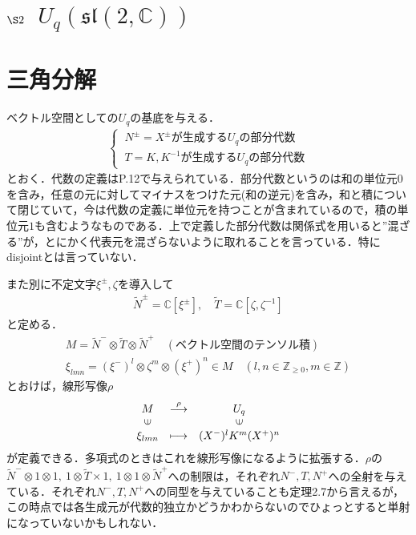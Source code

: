 \documentclass[dvipdfmx]{jsarticle}
\title{\empty}
\author{\empty}
\date{\today}
\begin{document}
%
%
%
%
\section*{$\S 2${\ }$U_q(\mathfrak{sl}(2,\mathbb{C}))$}
\section*{三角分解}
ベクトル空間としての$U_q$の基底を与える．
\begin{align*}
\begin{cases}
{\ }N^\pm=X^\pm が生成する U_q の部分代数 \\
{\ }T=K,K^{-1} が生成する U_q の部分代数
\end{cases}
\end{align*}
とおく．代数の定義はP.12で与えられている．部分代数というのは和の単位元$0$を含み，任意の元に対してマイナスをつけた元(和の逆元)を含み，和と積について閉じていて，今は代数の定義に単位元を持つことが含まれているので，積の単位元$1$も含むようなものである．上で定義した部分代数は関係式を用いると''混ざる''が，とにかく代表元を混ざらないように取れることを言っている．特にdisjointとは言っていない．\par
また別に不定文字$\xi^\pm,\zeta$を導入して
\begin{align*}
\widetilde{N}^\pm=\mathbb{C}[\xi^\pm], \quad \widetilde{T}=\mathbb{C}[\zeta,\zeta^{-1}]
\end{align*}
と定める．
\begin{align*}
M=\widetilde{N}^-\otimes\widetilde{T}\otimes\widetilde{N}^+ \quad (ベクトル空間のテンソル積) \\
\xi_{lmn}=(\xi^-)^l\otimes \zeta^m\otimes (\xi^+)^n\in M \quad (l,n\in\mathbb{Z}_{\geq 0},m\in\mathbb{Z})
\end{align*}
とおけば，線形写像$\rho$
\begin{eqnarray*}
\begin{array}{ccc}
M & \stackrel{\rho}{\longrightarrow} & U_q \\
\rotatebox{90}{$\in$} & & \rotatebox{90}{$\in$} \\
\xi_{lmn} & \longmapsto & (X^-)^lK^m(X^+)^n
\end{array}
\end{eqnarray*}
が定義できる．多項式のときはこれを線形写像になるように拡張する．$\rho$の$\widetilde{N}^-\otimes 1\otimes 1,{\ }1\otimes \widetilde{T}\times 1,{\ }1\otimes 1\otimes \widetilde{N}^+$への制限は，それぞれ$N^-,T,N^+$への全射を与えている．それぞれ$N^-,T,N^+$への同型を与えていることも定理2.7から言えるが，この時点では各生成元が代数的独立かどうかわからないのでひょっとすると単射になっていないかもしれない．
\end{document}
